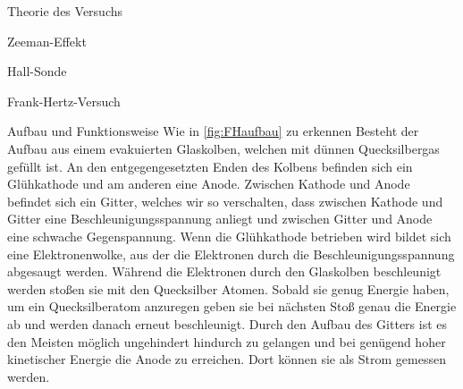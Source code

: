 \documentclass[pdftex, a4paper,11pt, twoside, ngerman]{report}
\begin{document}
\begin{chapter}{Theorie des Versuchs}
\begin{section}{Zeeman-Effekt}
\begin{subsection}{Hall-Sonde}

      \end{subsection}
      
    \end{section}
    
    
    
    \begin{section}{Frank-Hertz-Versuch}
      
      
      
      \begin{subsection}{Aufbau und Funktionsweise}
        Wie in \cref{fig:FHaufbau} zu erkennen Besteht der Aufbau aus einem
        evakuierten Glaskolben, welchen mit dünnen Quecksilbergas gefüllt ist. 
        An den entgegengesetzten Enden des Kolbens befinden sich ein
        Glühkathode und am anderen eine Anode. Zwischen Kathode und Anode
        befindet sich ein Gitter, welches wir so verschalten, dass zwischen
        Kathode und Gitter eine Beschleunigungsspannung anliegt und zwischen
        Gitter und Anode eine schwache Gegenspannung. Wenn die Glühkathode
        betrieben wird bildet sich eine Elektronenwolke, aus der die Elektronen
        durch die Beschleunigungsspannung abgesaugt werden. Während die
        Elektronen durch den Glaskolben beschleunigt werden stoßen sie mit den
        Quecksilber Atomen. Sobald sie genug Energie haben, um ein
        Quecksilberatom anzuregen geben sie bei nächsten Stoß genau die Energie
        ab und werden danach erneut beschleunigt. Durch den Aufbau des Gitters
        ist es den Meisten möglich ungehindert hindurch zu gelangen und bei
        genügend hoher kinetischer Energie die Anode zu erreichen. Dort können
        sie als Strom gemessen werden.
        \begin{figure}[ht]

\end{figure}
\end{subsection}
\end{section}
\end{chapter}
\end{document}
